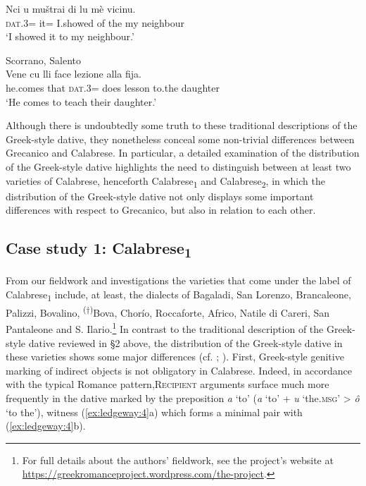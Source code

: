 \documentclass[output=paper,modfonts,nonflat]{langsci/langscibook}
\begin{document}
\ex
	\gll Nci  u  muštrai  di  lu  mè  vicinu.\\
    \textsc{dat}.3=  it=  I.showed  of  the  my  neighbour\\
    \glt `I showed it to my neighbour.'
\z
\z

\ea\label{ex:ledgeway:3}
Scorrano, Salento\\
\gll Vene  cu  lli  face  lezione  alla  fija.\\
he.comes  that  \textsc{dat}.3=  does  lesson  to.the  daughter\\
\glt `He comes to teach their daughter.'
\z

Although there is undoubtedly some truth to these traditional descriptions of the Greek-style dative, they nonetheless conceal some non-trivial differences between Grecanico and Calabrese. In particular, a detailed examination of the distribution of the Greek-style dative highlights the need to distinguish between at least two varieties of Calabrese, henceforth Calabrese\textsubscript{1} and Calabrese\textsubscript{2}, in which the distribution of the Greek-style dative not only displays some important differences with respect to Grecanico, but also in relation to each other.

\subsection{Case study 1: Calabrese\textsubscript{1}}

From our fieldwork and investigations the varieties that come under the label of Calabrese\textsubscript{1} include, at least, the dialects of Bagaladi, San Lorenzo, Brancaleone, Palizzi, Bovalino, \textsuperscript{(†)}Bova, Chorío, Roccaforte, Africo, Natile di Careri, San Pantaleone and S. Ilario.\footnote{For full details about the authors’ fieldwork, see the project’s website at \url{https://greekromanceproject.wordpress.com/the-project}.} In contrast to the traditional description of the Greek-style dative reviewed in §2 above, the distribution of the Greek-style dative in these varieties shows some major differences (cf. \citealt{Trumper2003}; \citealt[193-196]{Ledgeway2013}). First, Greek-style genitive marking of indirect objects is not obligatory in Calabrese. Indeed, in accordance with the typical Romance pattern,\textsc{Recipient} arguments surface much more frequently in the dative marked by the preposition \textit{a} ‘to’ (\textit{a} ‘to’ + \textit{u} ‘the.\textsc{msg}’ > \textit{ô} ‘to the’), witness (\ref{ex:ledgeway:4}a) which forms a minimal pair with (\ref{ex:ledgeway:4}b).
\end{document}
